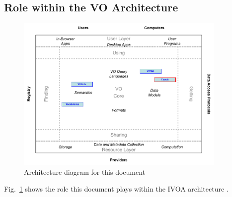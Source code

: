 \documentclass[11pt,a4paper]{ivoa}
\begin{document}
\pagebreak
\subsection{Role within the VO Architecture}

\begin{figure}[h]
\centering


\includegraphics[width=0.9\textwidth]{role_diagram.pdf}
\caption{Architecture diagram for this document}
\label{fig:archdiag}
\end{figure}

Fig.~\ref{fig:archdiag} shows the role this document plays within the
IVOA architecture \citep{note:VOARCH}.



\appendix













\end{document}
